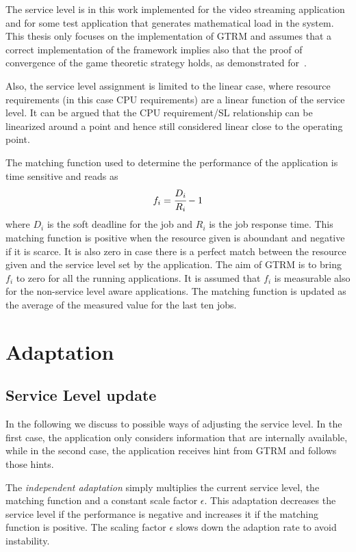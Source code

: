 \documentclass[nobiblatex]{LTHthesis}
\begin{document}
The service level is in this work implemented for the video streaming
application and for some test application that generates mathematical load
in the system. This thesis only focuses on the implementation of GTRM and 
assumes that a correct implementation of the framework implies also that
the proof of convergence of the game theoretic strategy holds, as
demonstrated for~\cite{gtrm}.

Also, the service level assignment is limited to the linear case, where
resource requirements (in this case CPU requirements) are a linear function 
of the service level. It can be argued that the CPU requirement/SL
relationship can be linearized around a point and hence still considered
linear close to the operating point. 

The matching function used to determine the performance of the application is
time sensitive and reads as
\begin{equation}
f_{i}=\cfrac{D_{i}}{R_{i}}-1
\end{equation}
where $D_{i}$ is the soft deadline for the job and $R_{i}$ is the job 
response time. This matching function is positive when the resource given is
aboundant and negative if it is scarce. It is also zero in case there
is a perfect match between the resource given and the service level set by
the application. The aim of GTRM is to bring $f_i$ to zero for all the
running applications. It is assumed that $f_i$ is measurable also for the
non-service level aware applications. The matching function is updated as
the average of the measured value for the last ten jobs.


\section{Adaptation}

\subsection{Service Level update}
In the following we discuss to possible ways of adjusting the service level.
In the first case, the application only considers information that are
internally available, while in the second case, the application receives
hint from GTRM and follows those hints.

The \emph{independent adaptation} simply multiplies the current service level,
the matching function and a constant scale factor $\epsilon$. This adaptation
decreases the service level if the performance is negative and increases it 
if the matching function is positive. The scaling factor $\epsilon$ slows 
down the adaption rate to avoid instability. 
\end{document}
